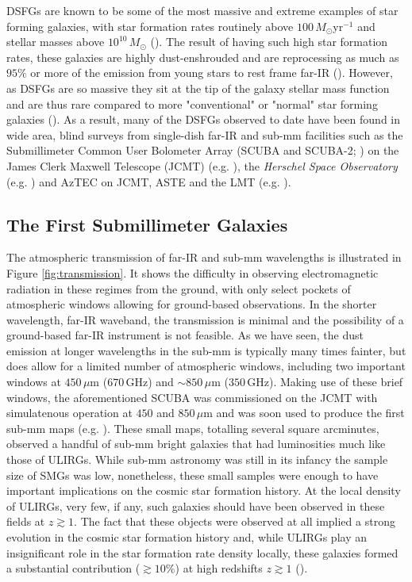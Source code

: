 DSFGs are known to be some of the most massive and extreme examples of star forming galaxies, with star formation rates routinely above $100\,M_\odot$yr$^{-1}$ and stellar masses above $10^{10}\,M_\odot$ (\citealt{Borys_2005,Michalowski_2010, Hainline_2011, Casey_2014b}). The result of having such high star formation rates, these galaxies are highly dust-enshrouded and are reprocessing as much as $95\%$ or more of the emission from young stars to rest frame far-IR (\citealt{Blain_2002, Casey_2014b}). However, as DSFGs are so massive they sit at the tip of the galaxy stellar mass function and are thus rare compared to more "conventional" or "normal" star forming galaxies (\citealt{Chapman_2005}). As a result, many of the DSFGs observed to date have been found in wide area, blind surveys from single-dish far-IR and sub-mm facilities such as the Submillimeter Common User Bolometer Array (SCUBA and SCUBA-2; \citealt{Holland_1999, Holland_2013}) on the James Clerk Maxwell Telescope (JCMT) (e.g. \citealt{Smail_1997, Hughes_1998}), the \textit{Herschel Space Observatory} (e.g. \citealt{Eales_2010, Elbaz_2011, Oliver_2012}) and AzTEC on JCMT, ASTE and the LMT (e.g. \citealt{Scott_2008, Aretxaga_2011}).

\subsection{The First Submillimeter Galaxies}
\label{sec:first_submm_galaxies}

The atmospheric transmission of far-IR and sub-mm wavelengths is illustrated in Figure \ref{fig:transmission}. It shows the difficulty in observing electromagnetic radiation in these regimes from the ground, with only select pockets of atmospheric windows allowing for ground-based observations. In the shorter wavelength, far-IR waveband, the transmission is minimal and the possibility of a ground-based far-IR instrument is not feasible. As we have seen, the dust emission at longer wavelengths in the sub-mm is typically many times fainter, but does allow for a limited number of atmospheric windows, including two important windows at $450\,\mu$m ($670\,$GHz) and $\sim 850\,\mu$m ($350\,$GHz). Making use of these brief windows, the aforementioned SCUBA was commissioned on the JCMT with simulatenous operation at $450$ and $850\,\mu$m and was soon used to produce the first sub-mm maps (e.g. \citealt{Smail_1997, Barger_1998, Hughes_1998}). These small maps, totalling several square arcminutes, observed a handful of sub-mm bright galaxies that had luminosities much like those of ULIRGs. While sub-mm astronomy was still in its infancy the sample size of SMGs was low, nonetheless, these small samples were enough to have important implications on the cosmic star formation history. At the local density of ULIRGs, very few, if any, such galaxies should have been observed in these fields at $z \gtrsim 1$. The fact that these objects were observed at all implied a strong evolution in the cosmic star formation history and, while ULIRGs play an insignificant role in the star formation rate density locally, these galaxies formed a substantial contribution ($\gtrsim 10\%$) at high redshifts $z \gtrsim 1$ (\citealt{Casey_2014b}). 

